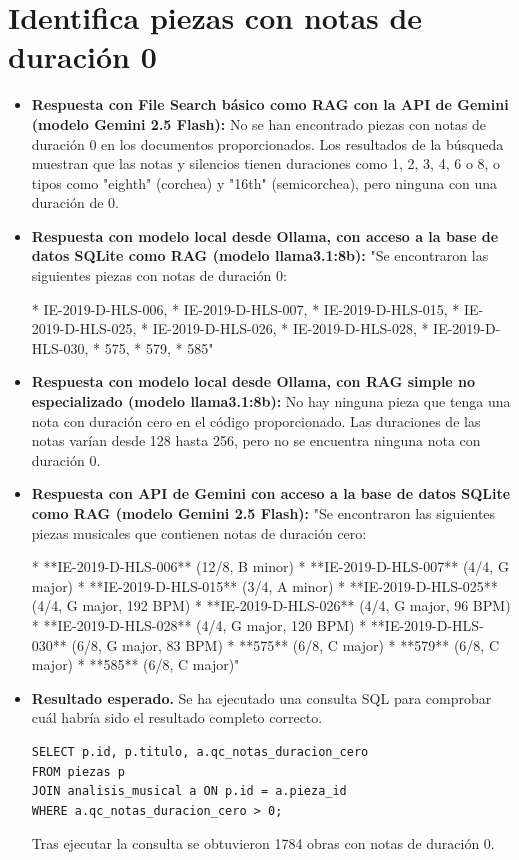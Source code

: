 \section{Identifica piezas con notas de duración 0}
\begin{itemize}
    \item \textbf{Respuesta con File Search básico como RAG con la API de Gemini (modelo Gemini 2.5 Flash):} No se han encontrado piezas con notas de duración 0 en los documentos proporcionados. Los resultados de la búsqueda muestran que las notas y silencios tienen duraciones como 1, 2, 3, 4, 6 o 8, o tipos como "eighth" (corchea) y "16th" (semicorchea), pero ninguna con una duración de 0.
    \item \textbf{Respuesta con modelo local desde Ollama, con acceso a la base de datos SQLite como RAG (modelo llama3.1:8b):} "Se encontraron las siguientes piezas con notas de duración 0:

* IE-2019-D-HLS-006,
* IE-2019-D-HLS-007,
* IE-2019-D-HLS-015,
* IE-2019-D-HLS-025,
* IE-2019-D-HLS-026,
* IE-2019-D-HLS-028,
* IE-2019-D-HLS-030,
* 575,
* 579,
* 585"
\item \textbf{Respuesta con modelo local desde Ollama, con RAG simple no especializado (modelo llama3.1:8b):} No hay ninguna pieza que tenga una nota con duración cero en el código proporcionado. Las duraciones de las notas varían desde 128 hasta 256, pero no se encuentra ninguna nota con duración 0.
\item \textbf{Respuesta con API de Gemini con acceso a la base de datos SQLite como RAG (modelo Gemini 2.5 Flash):} "Se encontraron las siguientes piezas musicales que contienen notas de duración cero:

*   **IE-2019-D-HLS-006** (12/8, B minor)
*   **IE-2019-D-HLS-007** (4/4, G major)
*   **IE-2019-D-HLS-015** (3/4, A minor)
*   **IE-2019-D-HLS-025** (4/4, G major, 192 BPM)
*   **IE-2019-D-HLS-026** (4/4, G major, 96 BPM)
*   **IE-2019-D-HLS-028** (4/4, G major, 120 BPM)
*   **IE-2019-D-HLS-030** (6/8, G major, 83 BPM)
*   **575** (6/8, C major)
*   **579** (6/8, C major)
*   **585** (6/8, C major)"
\item \textbf{Resultado esperado.} Se ha ejecutado una consulta SQL para comprobar cuál habría sido el resultado completo correcto.
    \begin{verbatim}
SELECT p.id, p.titulo, a.qc_notas_duracion_cero
FROM piezas p
JOIN analisis_musical a ON p.id = a.pieza_id
WHERE a.qc_notas_duracion_cero > 0;
    \end{verbatim}    
    Tras ejecutar la consulta se obtuvieron 1784 obras con notas de duración 0.


\end{itemize}
